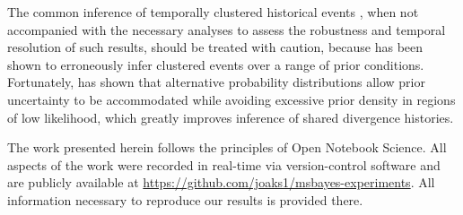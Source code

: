 The common inference of temporally clustered historical events
\citep{Barber2010, Bell2012, Carnaval2009, Chan2011, Chan2014, Daza2010,
    Hickerson2006, Huang2011, Lawson2010, Leache2007, Plouviez2009, Stone2012,
    Voje2009},
when not accompanied with the necessary analyses to assess the robustness and
temporal resolution of such results, should be treated with caution, because
\msb has been shown to erroneously infer clustered events over a range of prior
conditions.
Fortunately, \citet{Oaks2014dpp} has shown that alternative probability
distributions allow prior uncertainty to be accommodated while avoiding
excessive prior density in regions of low likelihood, which greatly improves
inference of shared divergence histories.

The work presented herein follows the principles of Open Notebook Science.
All aspects of the work were recorded in real-time via version-control software
and are publicly available at
\href{https://github.com/joaks1/msbayes-experiments}{\url{https://github.com/joaks1/msbayes-experiments}}.
All information necessary to reproduce our results is provided there.

